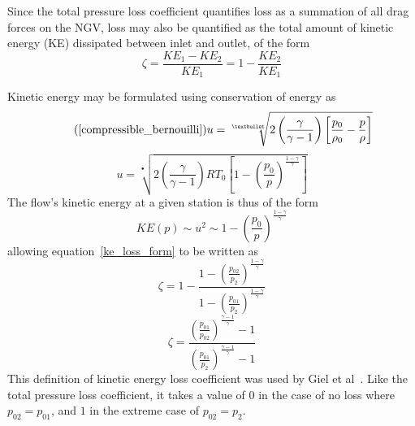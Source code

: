 \documentclass[a4paper, 11pt, oneside]{report}
\begin{document}
Since the total pressure loss coefficient quantifies loss as a summation of all drag forces on the NGV, loss may also be quantified as the total amount of kinetic energy (KE) dissipated between inlet and outlet, of the form
\begin{equation}\label{ke_loss_form}
\zeta =
\frac{KE_1 - KE_2}{KE_1}
=
1 - \frac{KE_2}{KE_1}
\end{equation}

Kinetic energy may be formulated using conservation of energy as
\begin{equation}\tag{\ref{compressible_bernouilli}}
u = 
\sqrt[•]{ 
2 \left( \frac{\gamma}{\gamma - 1} \right) \left[ \frac{p_0}{\rho_0} - \frac{p}{\rho} \right] 
}
\end{equation}
\begin{equation}
u =
\sqrt[•]{ 
	2 \left( \frac{\gamma}{\gamma - 1} \right)
	R T_0
	\left[
		1 - \left(
			\frac{p_0}{p}
		\right)
		^\frac{1-\gamma}{\gamma}
	\right] 
}
\end{equation}
The flow's kinetic energy at a given station is thus of the form
\begin{equation}
KE(p) 
\sim
u^2
\sim
1 - \left(
	\frac{p_0}{p}
\right)
^\frac{1-\gamma}{\gamma}
\end{equation}
allowing equation~\ref{ke_loss_form} to be written as
\begin{equation}
\zeta = 
1 - 
\frac{
	1 -
	\left(
		\frac{p_{02}}{p_2}
	\right)
	^\frac{1-\gamma}{\gamma}
}{
	1 -
	\left(
		\frac{p_{01}}{p_2}
	\right)
	^\frac{1-\gamma}{\gamma}
}
\end{equation}
\begin{equation}\label{ke_loss_definition}
\zeta = 
\frac{ 
	\left(
		\frac{p_{01}}{p_{02}}
	\right)
	^\frac{\gamma-1}{ \gamma } - 1 
}{
	\left(
	\frac{p_{01}}{p_{2}}
	\right)
	^\frac{\gamma-1}{ \gamma } - 1 
}
\end{equation}
This definition of kinetic energy loss coefficient was used by Giel et al~\cite{giel_te_thickness}. Like the total pressure loss coefficient, it takes a value of $0$ in the case of no loss where $p_{02} = p_{01}$, and $1$ in the extreme case of $p_{02} = p_2$.
\end{document}
